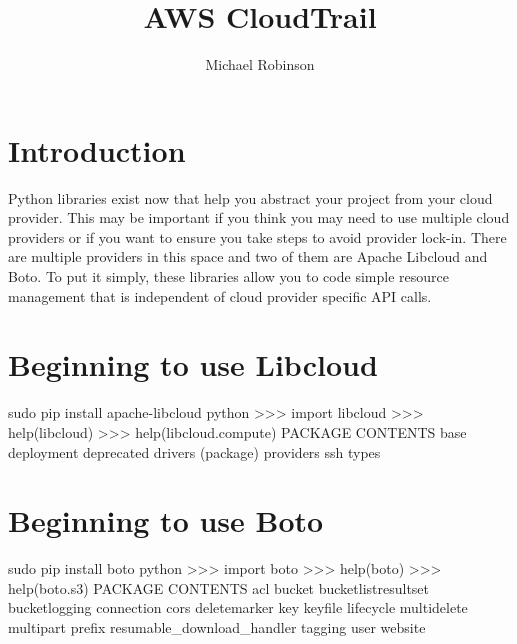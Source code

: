 
\title{AWS CloudTrail}

\author{Michael Robinson}


\renewcommand{\shortauthors}{M. Robinson}


\begin{abstract}

\end{abstract}


\maketitle

\section{Introduction}

Python libraries exist now that help you abstract your project from your cloud 
provider. This may be important if you think you may need to use multiple cloud 
providers or if you want to ensure you take steps to avoid provider lock-in. 
There are multiple providers in this space and two of them are Apache Libcloud 
and Boto. To put it simply, these libraries allow you to code simple resource 
management that is independent of cloud provider specific API calls. 

\section{Beginning to use Libcloud}

sudo pip install apache-libcloud
python
>>> import libcloud
>>> help(libcloud)
>>> help(libcloud.compute)
PACKAGE CONTENTS
    base
    deployment
    deprecated
    drivers (package)
    providers
    ssh
    types

\section{Beginning to use Boto}

sudo pip install boto
python
>>> import boto
>>> help(boto)
>>> help(boto.s3)
PACKAGE CONTENTS
    acl
    bucket
    bucketlistresultset
    bucketlogging
    connection
    cors
    deletemarker
    key
    keyfile
    lifecycle
    multidelete
    multipart
    prefix
    resumable_download_handler
    tagging
    user
    website

